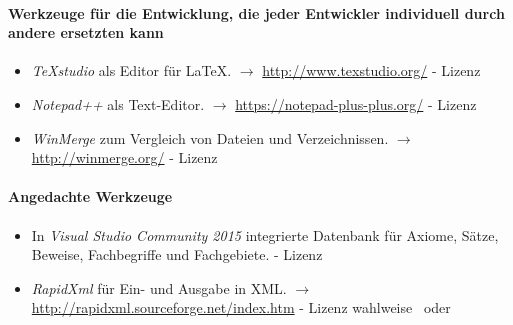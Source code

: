 \documentclass[english,ngerman,parskip=half,headsepline,footsepline]{scrreprt}
\newcounter{Enumi}
\begin{document}
	\paragraph{Werkzeuge für die Entwicklung, die jeder Entwickler individuell durch andere ersetzten kann}
	\begin{itemize}
		\setcounter{enumi}{\value{Enumi}}

		\item\label{Werkzeug:TeXstudio}\emph{\TeX studio} als Editor für \LaTeX. $\rightarrow$ \url{http://www.texstudio.org/} - Lizenz~\cite{bib:GPLii}

		\item\label{Werkzeug:Notepadpp}\emph{Notepad++} als Text-Editor. $\rightarrow$ \url{https://notepad-plus-plus.org/} - Lizenz~\cite{bib:GPLi}

		\item\label{Werkzeug:WinMerge}\emph{WinMerge} zum Vergleich von Dateien und Verzeichnissen. $\rightarrow$ \url{http://winmerge.org/} - Lizenz~\cite{bib:GPLi}

		\setcounter{Enumi}{\value{enumi}}
	\end{itemize}

	\paragraph{Angedachte Werkzeuge}
	\begin{itemize}
		\setcounter{enumi}{\value{Enumi}}

		\item\label{Werkzeug:VSC DB}In \emph{Visual Studio Community 2015} integrierte Datenbank für Axiome, Sätze, Beweise, Fachbegriffe und Fachgebiete. - Lizenz~\cite{bib:EULA}

		\item\label{Werkzeug:RapidXml}\emph{RapidXml} für Ein- und Ausgabe in XML. $\rightarrow$ \url{http://rapidxml.sourceforge.net/index.htm} - Lizenz wahlweise~\cite{bib:BSLi} oder~\cite{bib:MIT}

	\end{itemize}

\end{document}
